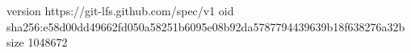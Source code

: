 version https://git-lfs.github.com/spec/v1
oid sha256:e58d00dd49662fd050a58251b6095e08b92da5787794439639b18f638276a32b
size 1048672
